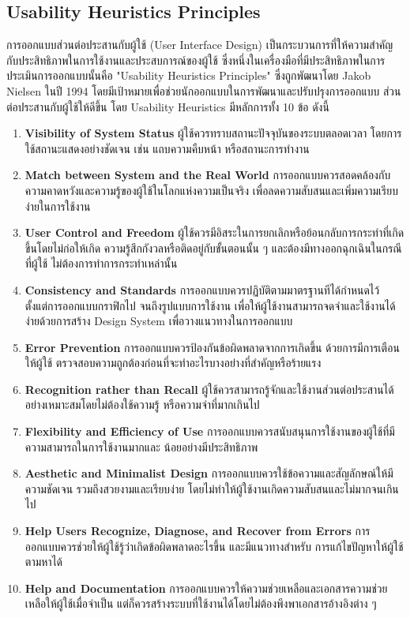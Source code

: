 \subsection{Usability Heuristics Principles}
การออกแบบส่วนต่อประสานกับผู้ใช้ (User Interface Design)
เป็นกระบวนการที่ให้ความสำคัญกับประสิทธิภาพในการใช้งานและประสบการณ์ของผู้ใช้
ซึ่งหนึ่งในเครื่องมือที่มีประสิทธิภาพในการประเมินการออกแบบนั้นคือ
"Usability Heuristics Principles" ซึ่งถูกพัฒนาโดย Jakob Nielsen
ในปี 1994 โดยมีเป้าหมายเพื่อช่วยนักออกแบบในการพัฒนาและปรับปรุงการออกแบบ
ส่วนต่อประสานกับผู้ใช้ให้ดีขึ้น โดย Usability Heuristics มีหลักการทั้ง 10 ข้อ ดังนี้
\begin{enumerate}
      \item \textbf{Visibility of System Status}
            ผู้ใช้ควรทราบสถานะปัจจุบันของระบบตลอดเวลา โดยการใช้สถานะแสดงอย่างชัดเจน
            เช่น แถบความคืบหน้า หรือสถานะการทำงาน
      \item \textbf{Match between System and the Real World}
            การออกแบบควรสอดคล้องกับความคาดหวังและความรู้ของผู้ใช้ในโลกแห่งความเป็นจริง
            เพื่อลดความสับสนและเพิ่มความเรียบง่ายในการใช้งาน
      \item \textbf{User Control and Freedom}
            ผู้ใช้ควรมีอิสระในการยกเลิกหรือย้อนกลับการกระทำที่เกิดขึ้นโดยไม่ก่อให้เกิด
            ความรู้สึกกังวลหรือติดอยู่กับขั้นตอนนั้น ๆ  และต้องมีทางออกฉุกเฉินในกรณีที่ผู้ใช้
            ไม่ต้องการทำการกระทำเหล่านั้น
      \item \textbf{Consistency and Standards}
            การออกแบบควรปฏิบัติตามมาตรฐานทีได้กำหนดไว้ ตั้งแต่การออกแบบกราฟิกไป
            จนถึงรูปแบบการใช้งาน เพื่อให้ผู้ใช้งานสามารถจดจำและใช้งานได้ง่ายด้วยการสร้าง
            Design System เพื่อวางแนวทางในการออกแบบ
      \item \textbf{Error Prevention}
            การออกแบบควรป้องกันข้อผิดพลาดจากการเกิดขึ้น ด้วยการมีการเตือนให้ผู้ใช้
            ตรวจสอบความถูกต้องก่อนที่จะทำอะไรบางอย่างที่สำคัญหรือร้ายแรง
      \item \textbf{Recognition rather than Recall}
            ผู้ใช้ควรสามารถรู้จักและใช้งานส่วนต่อประสานได้อย่างเหมาะสมโดยไม่ต้องใช้ความรู้
            หรือความจำที่มากเกินไป
      \item \textbf{Flexibility and Efficiency of Use}
            การออกแบบควรสนับสนุนการใช้งานของผู้ใช้ที่มีความสามารถในการใช้งานมากและ
            น้อยอย่างมีประสิทธิภาพ
      \item \textbf{Aesthetic and Minimalist Design}
            การออกแบบควรใช้ข้อความและสัญลักษณ์ให้มีความชัดเจน รวมถึงสวยงามและเรียบง่าย
            โดยไม่ทำให้ผู้ใช้งานเกิดความสับสนและไม่มากจนเกินไป
      \item \textbf{Help Users Recognize, Diagnose, and Recover from Errors}
            การออกแบบควรช่วยให้ผู้ใช้รู้ว่าเกิดข้อผิดพลาดอะไรขึ้น และมีแนวทางสำหรับ
            การแก้ไขปัญหาให้ผู้ใช้ตามหาได้
      \item \textbf{Help and Documentation}
            การออกแบบควรให้ความช่วยเหลือและเอกสารความช่วยเหลือให้ผู้ใช้เมื่อจำเป็น
            แต่ก็ควรสร้างระบบที่ใช้งานได้โดยไม่ต้องพึงพาเอกสารอ้างอิงต่าง ๆ
\end{enumerate}
